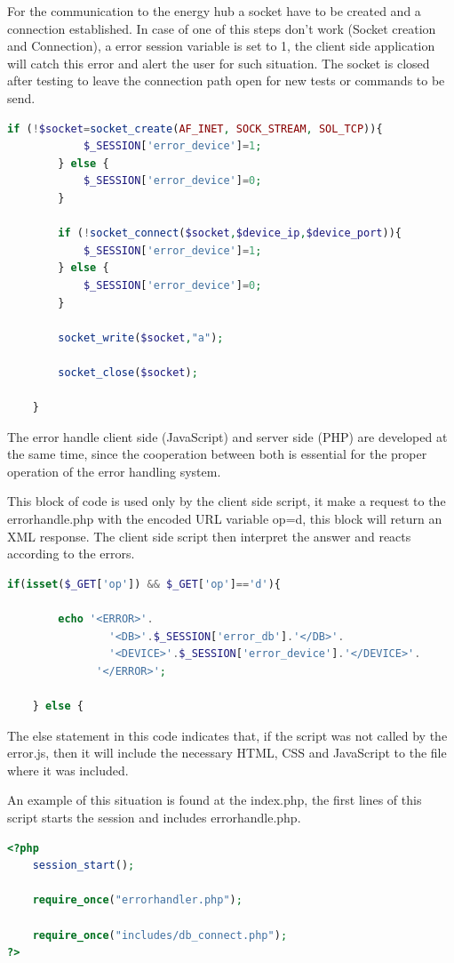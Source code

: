 For the communication to the energy hub a socket have to be created and a connection established. In case of one of this steps don't work (Socket creation and Connection), a error session variable is set to 1, the client side application will catch this error and alert the user for such situation. The socket is closed after testing to leave the connection path open for new tests or commands to be send.

\begin{lstlisting}[language=php]
		if (!$socket=socket_create(AF_INET, SOCK_STREAM, SOL_TCP)){
			$_SESSION['error_device']=1;
		} else {
			$_SESSION['error_device']=0;
		}
	
		if (!socket_connect($socket,$device_ip,$device_port)){
			$_SESSION['error_device']=1;
		} else {
			$_SESSION['error_device']=0;
		}
		
		socket_write($socket,"a");
		
		socket_close($socket);
	
	}
\end{lstlisting}

The error handle client side (JavaScript) and server side (PHP) are developed at the same time, since the cooperation between both is essential for the proper operation of the error handling system.

This block of code is used only by the client side script, it make a request to the errorhandle.php with the encoded URL variable op=d, this block will return an XML response. The client side script then interpret the answer and reacts according to the errors.
\begin{lstlisting}[language=php]
	if(isset($_GET['op']) && $_GET['op']=='d'){
		
		echo '<ERROR>'.
			    '<DB>'.$_SESSION['error_db'].'</DB>'.
				'<DEVICE>'.$_SESSION['error_device'].'</DEVICE>'.
			  '</ERROR>';
		
	} else {
\end{lstlisting}

The else statement in this code indicates that, if the script was not called by the error.js, then it will include the necessary HTML, CSS and JavaScript to the file where it was included.

An example of this situation is found at the index.php, the first lines of this script starts the session and includes errorhandle.php.

\begin{lstlisting}[language=php]
<?php
	session_start();
	
	require_once("errorhandler.php");
	
	require_once("includes/db_connect.php");
?>
\end{lstlisting}

